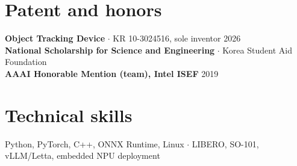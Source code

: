 \documentclass[10pt,a4paper]{article}
\begin{document}
\section{Patent and honors}
\textbf{Object Tracking Device} $\cdot$ KR 10-3024516, sole inventor \hfill 2026\\
\textbf{National Scholarship for Science and Engineering} $\cdot$ Korea Student Aid Foundation\\
\textbf{AAAI Honorable Mention (team), Intel ISEF} \hfill 2019\\
\section{Technical skills}
Python, PyTorch, C++, ONNX Runtime, Linux $\cdot$ LIBERO, SO-101, vLLM/Letta, embedded NPU deployment
\end{document}
